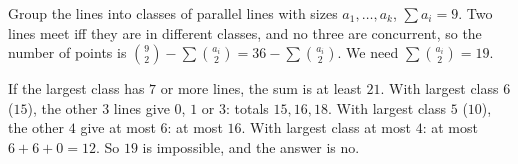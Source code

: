 Group the lines into classes of parallel lines with sizes $a_1,\dots,a_k$, $\sum a_i=9$. Two lines meet iff they are in different classes, and no three are concurrent, so the number of points is $\binom92-\sum\binom{a_i}2=36-\sum\binom{a_i}2$. We need $\sum\binom{a_i}2=19$.

If the largest class has $7$ or more lines, the sum is at least $21$. With largest class $6$ ($15$), the other $3$ lines give $0$, $1$ or $3$: totals $15,16,18$. With largest class $5$ ($10$), the other $4$ give at most $6$: at most $16$. With largest class at most $4$: at most $6+6+0=12$. So $19$ is impossible, and the answer is $\boxed{\text{no}}$.

